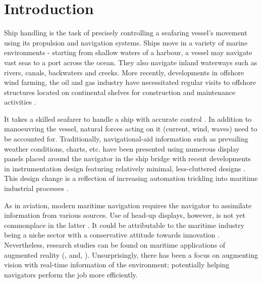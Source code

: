 \chapter{Introduction}

Ship handling is the task of precisely controlling a seafaring vessel’s movement using its propulsion and navigation systems. Ships move in a variety of marine environments - starting from shallow waters of a harbour, a vessel may navigate vast seas to a port across the ocean. They also navigate inland waterways such as rivers, canals, backwaters and creeks. More recently, developments in offshore wind farming, the oil and gas industry have necessitated regular visits to offshore structures located on continental shelves for construction and maintenance activities \parencite{halvorsen2012optimal}. 



It takes a skilled seafarer to handle a ship with accurate control \parencite{wiki:seamanship}. In addition to manoeuvring the vessel, natural forces acting on it (current, wind, waves) need to be accounted for. Traditionally, navigational-aid information such as prevailing weather conditions, charts, etc. have been presented using numerous display panels placed around the navigator in the ship bridge \parencite{vasiljevic2011augmented} with recent developments in instrumentation design featuring relatively minimal, less-cluttered designs \parencite{sauer2002effects}. This design change is a reflection of increasing automation trickling into maritime industrial processes \parencite{perunovic2011innovation}. 
 
As in aviation, modern maritime navigation requires the navigator to assimilate information from various sources. Use of head-up displays, however, is not yet commonplace in the latter \parencite{holder2011maritime}. It could be attributable to the maritime industry being a niche sector with a conservative attitude towards innovation \parencite{perunovic2011innovation}. Nevertheless, research studies can be found on maritime applications of augmented reality (\cite{hugues2010experimental}, \cite{vasiljevic2011augmented} \cite{okazaki2014development} and, \cite{von2014maritime}). Unsurprisingly, there has been a focus on augmenting vision with real-time information of the environment; potentially helping navigators perform the job more efficiently. 

